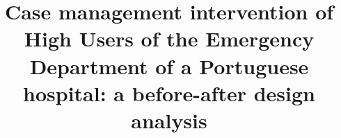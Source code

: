 \documentclass{bmcart}
\begin{document}
\begin{frontmatter}

\begin{fmbox}


\title{Case management intervention of High Users of the Emergency Department of a Portuguese hospital: a before-after design analysis}


\author[
   addressref={aff1,aff2},
  email={simao.goncalves@vohcolab.org}
]{ }
\author[
  addressref={aff1,aff3},                   %
  corref={aff1},                       %
  email={francisco.vonhafe@vohcolab.org}   %
]{ }
\author[
  addressref={aff1,aff6},
  email={flavio.martins@vohcolab.org}
]{ }
\author[
  addressref={aff4},
  email={carla.menino@hgo.min-saude.pt}
]{ }
\author[
  addressref={aff5},
  email={m.jose.guimaraes@arslvt.min-saude.pt}
]{ }
\author[
  addressref={aff4},
  email={andreia.mesquita@hgo.min-saude.pt}
]{ }
\author[
  addressref={aff4},
  email={susana.sampaio@hgo.min-saude.pt}
]{ }
\author[
  addressref={aff1,aff3},
  email={ana.londral@vohcolab.org}
]{ }



\end{fmbox}
\end{frontmatter}
\end{document}
